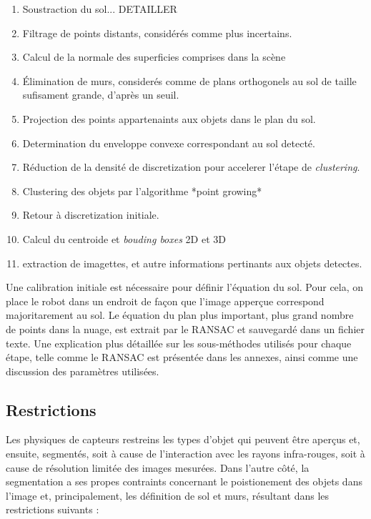 \begin{enumerate}
\item Soustraction du sol... {\color{blue} DETAILLER}
  
\item Filtrage de points distants, considérés comme plus incertains.
  
\item Calcul de la normale des superficies comprises dans la scène
  
\item Élimination de murs, considerés comme de plans orthogonels au
  sol de taille sufisament grande, d'après un seuil.
  
\item Projection des points appartenaints aux objets dans le plan du
  sol.
  
\item Determination du enveloppe convexe correspondant au sol detecté.
  
\item Réduction de la densité de discretization pour accelerer l'étape
  de \textit{clustering}.
  
\item Clustering des objets par l'algorithme *point growing*
  
\item Retour à discretization initiale.
  
\item Calcul du centroide et \textit{bouding boxes} 2D et 3D
  
\item extraction de imagettes, et autre informations pertinants aux
  objets detectes.
\end{enumerate}

Une calibration initiale est nécessaire pour définir l'équation du
sol. Pour cela, on place le robot dans un endroit de façon que l'image
apperçue correspond majoritarement au sol. Le équation du plan plus
important, plus grand nombre de points dans la nuage, est extrait par
le RANSAC et sauvegardé dans un fichier texte. Une explication plus
détaillée sur les sous-méthodes utilisés pour chaque étape, telle
comme le RANSAC est présentée dans les annexes, ainsi comme une
discussion des paramètres utilisées.

\subsection{Restrictions} Les physiques de capteurs restreins les
types d'objet qui peuvent être aperçus et, ensuite, segmentés, soit à
cause de l'interaction avec les rayons infra-rouges, soit à cause de
résolution limitée des images mesurées. Dans l'autre côté, la
segmentation a ses propes contraints concernant le poistionement des
objets dans l'image et, principalement, les définition de sol et murs,
résultant dans les restrictions suivants :

